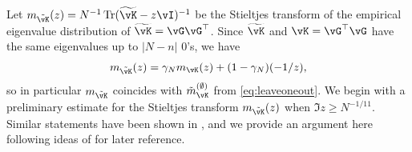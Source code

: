 Let $m_{\tilde \vK}(z)=N^{-1}\Tr (\widetilde \vK-z\vI)^{-1}$ be the Stieltjes
transform of the empirical eigenvalue distribution of $\widetilde \vK=\vG\vG^\top$.
Since $\widetilde \vK$ and $\vK=\vG^\top \vG$ have the same
eigenvalues up to $|N-n|$ 0's, we have
\begin{equation}\label{eq:m_tildeK}
m_{\tilde \vK}(z)=\gamma_N m_{\vK}(z)+(1-\gamma_N)(-1/z),
\end{equation}
so in particular $m_{\tilde \vK}$ coincides with $\tilde m_{\vK}^{(\emptyset)}$
from \eqref{eq:leaveoneout}.
We begin with a preliminary estimate for the Stieltjes transform
$m_{\tilde \vK}(z)$ when $\Im z \geq N^{-1/11}$. Similar statements have been shown
in \citep{silverstein1995strong,bai1998no}, and we provide an argument
here following ideas of \cite[Section 3]{bai1998no} for later reference.

